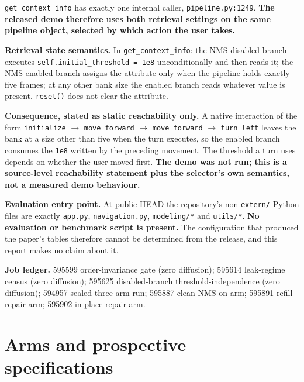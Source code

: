 \documentclass[11pt,a4paper]{article}
\newcommand{\code}[1]{\texttt{\small #1}}
\begin{document}
\code{get\_context\_info} has exactly one internal caller, \code{pipeline.py:1249}. \textbf{The
released demo therefore uses both retrieval settings on the same pipeline object, selected by which
action the user takes.}

\textbf{Retrieval state semantics.} In \code{get\_context\_info}: the NMS-disabled branch executes
\code{self.initial\_threshold = 1e8} unconditionally and then reads it; the NMS-enabled branch
assigns the attribute only when the pipeline holds exactly five frames; at any other bank size the
enabled branch reads whatever value is present. \code{reset()} does not clear the attribute.

\textbf{Consequence, stated as static reachability only.} A native interaction of the form
\code{initialize} $\to$ \code{move\_forward} $\to$ \code{move\_forward} $\to$ \code{turn\_left}
leaves the bank at a size other than five when the turn executes, so the enabled branch consumes the
\code{1e8} written by the preceding movement. The threshold a turn uses depends on whether the user
moved first. \textbf{The demo was not run; this is a source-level reachability statement plus the
selector's own semantics, not a measured demo behaviour.}

\textbf{Evaluation entry point.} At public HEAD the repository's non-\code{extern/} Python files are
exactly \code{app.py}, \code{navigation.py}, \code{modeling/*} and \code{utils/*}. \textbf{No
evaluation or benchmark script is present.} The configuration that produced the paper's tables
therefore cannot be determined from the release, and this report makes no claim about it.

\textbf{Job ledger.} 595599 order-invariance gate (zero diffusion); 595614 leak-regime census (zero
diffusion); 595625 disabled-branch threshold-independence (zero diffusion); 594957 sealed three-arm
run; 595887 clean NMS-on arm; 595891 refill repair arm; 595902 in-place repair arm.

\section{Arms and prospective specifications}
\end{document}

